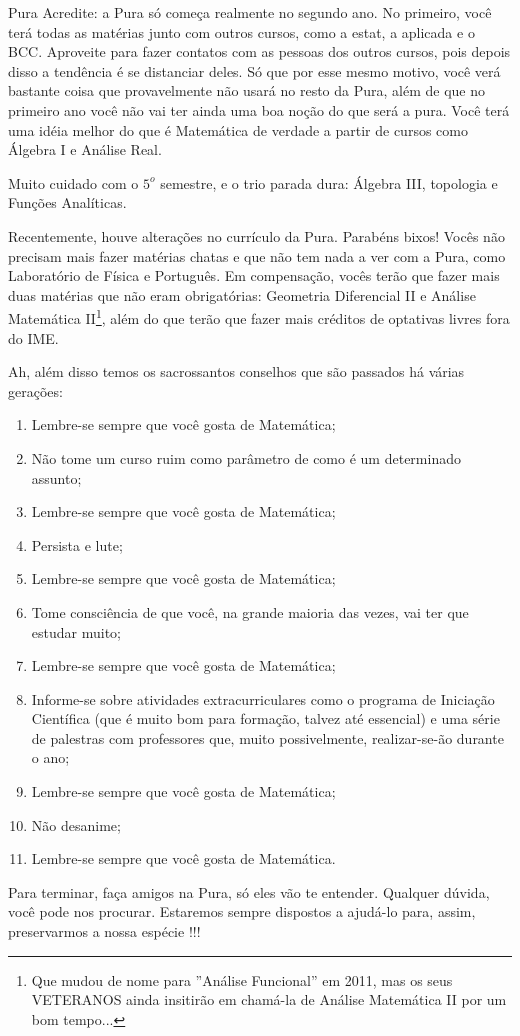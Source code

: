 \begin{subsecao}{Pura}
Acredite: a Pura só começa realmente no segundo ano. No primeiro, você terá
todas as matérias junto com outros cursos, como a estat, a aplicada e o BCC.
Aproveite para fazer contatos com as pessoas dos outros cursos, pois depois
disso a tendência é se distanciar deles. Só que por esse mesmo motivo, você
verá bastante coisa que provavelmente não usará no resto da Pura, além de que
no primeiro ano você não vai ter ainda uma boa noção do que será a pura. Você
terá uma idéia melhor do que é Matemática de verdade a partir de cursos
como Álgebra I e Análise Real.

Muito cuidado com o $5^{o}$ semestre, e o trio parada dura: Álgebra III,
topologia e Funções Analíticas.

Recentemente, houve alterações no currículo da Pura. Parabéns bixos! Vocês não
precisam mais fazer matérias chatas e que não tem nada a ver com a Pura, como
Laboratório de Física e Português. Em compensação, vocês terão que fazer mais
duas matérias que não eram obrigatórias: Geometria Diferencial II e Análise
Matemática II\footnote{Que mudou de nome para ''Análise Funcional'' em 2011,
mas os seus VETERANOS ainda insitirão em chamá-la de Análise Matemática II por
um bom tempo...}, além do que terão que fazer mais créditos de optativas livres
fora do IME.

Ah, além disso temos os sacrossantos conselhos que são passados há várias
gerações:
\begin{enumerate}
\item	Lembre-se sempre que você gosta de Matemática;
\item	Não tome um curso ruim como parâmetro de como é um determinado assunto;
\item	Lembre-se sempre que você gosta de Matemática;
\item	Persista e lute;
\item	Lembre-se sempre que você gosta de Matemática;
\item	Tome consciência de que você, na grande maioria das vezes, vai ter que
estudar muito;
\item	Lembre-se sempre que você gosta de Matemática;
\item	Informe-se sobre atividades extracurriculares como o programa de
Iniciação Científica (que é muito bom para formação, talvez até essencial) e
uma série de palestras com professores que, muito possivelmente, realizar-se-ão
durante o ano;
\item	Lembre-se sempre que você gosta de Matemática;
\item	Não desanime;
\item	Lembre-se sempre que você gosta de Matemática.

\end{enumerate}
Para terminar, faça amigos na Pura, só eles vão te entender. Qualquer dúvida,
você pode nos procurar. Estaremos sempre dispostos a ajudá-lo para, assim,
preservarmos a nossa espécie !!!

\end{subsecao}
